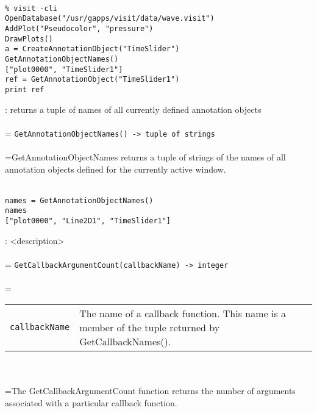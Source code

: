 \documentclass[10pt,a4paper]{report}
\begin{document}
\\[-6mm]
\begin{verbatim}% visit -cli
OpenDatabase("/usr/gapps/visit/data/wave.visit")
AddPlot("Pseudocolor", "pressure")
DrawPlots()
a = CreateAnnotationObject("TimeSlider")
GetAnnotationObjectNames()
["plot0000", "TimeSlider1"]
ref = GetAnnotationObject("TimeSlider1")
print ref
\end{verbatim}
\newpage


{}
: returns a tuple of names of all currently defined annotation objects\\[-3mm]

 \\ 
\hangindent=\parindent 
\verb!GetAnnotationObjectNames() -> tuple of strings!\\ [-3mm]

 \\ 
\hangindent=\parindent GetAnnotationObjectNames returns a tuple of strings of the names of all annotation objects defined for the currently active window. \\[-3mm] 

\\[-6mm]
\begin{verbatim}names = GetAnnotationObjectNames()
names
["plot0000", "Line2D1", "TimeSlider1"]
\end{verbatim}
\newpage


{}
: <description>\\[-3mm]

 \\ 
\hangindent=\parindent 
\verb!GetCallbackArgumentCount(callbackName) -> integer!\\ [-3mm]

 \\ 
\hangindent=\parindent 
\begin{tabular}{lp{9cm}}
\verb!callbackName! & The name of a callback function. This name is a member of the tuple returned by GetCallbackNames(). \\
\end{tabular} \\[-2mm]


 \\ 
\hangindent=\parindent The GetCallbackArgumentCount function returns the number of arguments  associated with a particular callback function. \\[-3mm] 
\end{document}
